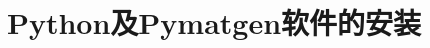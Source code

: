 \documentclass[10pt,a4paper]{article}
\begin{document}
\graphicspath{{figure/}}
%
\renewcommand{\abstractname}{\small{\CJKfamily{hei} 摘\quad 要}} %
\renewcommand{\refname}{\centering\CJKfamily{hei} 参考文献}
\renewcommand{\figurename}{{\bf Fig}.}
\renewcommand{\tablename}{{\bf Tab}.}

\makeatletter
\long{}
\makeatother

\newcommand{\keywords}[1]{{\hspace{0\ccwd}\small{\CJKfamily{hei} 关键词:}{\hspace{2ex}{#1}}\bigskip}}



\title{Python及Pymatgen软件的安装}

\author{
\small
\small
}
\date{}					%
\maketitle
\end{document}

